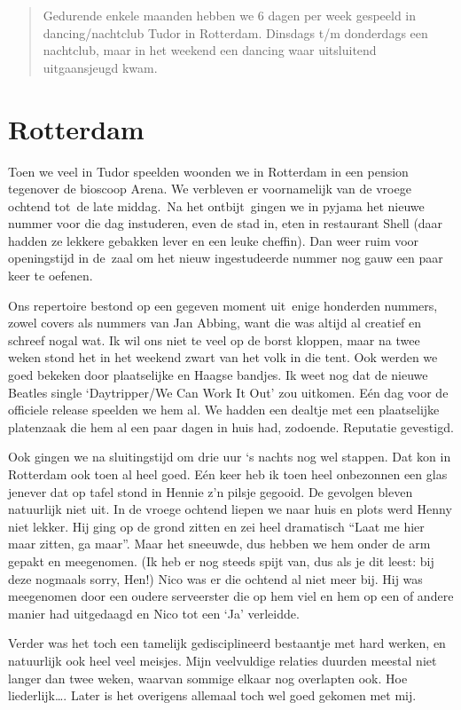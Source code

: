 \documentclass[12pt,twoside, openright]{memoir}
\begin{document}
\begin{quote}
Gedurende enkele maanden hebben we 6 dagen per week gespeeld in dancing/nachtclub Tudor in Rotterdam. Dinsdags t/m donderdags een nachtclub, maar in het weekend een dancing waar uitsluitend uitgaansjeugd kwam.
\end{quote} 

\section*{Rotterdam} %

Toen we veel in Tudor speelden woonden we in Rotterdam in een pension tegenover de bioscoop Arena. We verbleven er voornamelijk van de vroege ochtend tot de late middag. Na het ontbijt gingen we in pyjama het nieuwe nummer voor die dag instuderen, even de stad in, eten in restaurant Shell (daar hadden ze lekkere gebakken lever en een leuke cheffin). Dan weer ruim voor openingstijd in de zaal om het nieuw ingestudeerde nummer nog gauw een paar keer te oefenen. 

Ons repertoire bestond op een gegeven moment uit enige honderden nummers, zowel covers als nummers van Jan Abbing, want die was altijd al creatief en schreef nogal wat. Ik wil ons niet te veel op de borst kloppen, maar na twee weken stond het in het weekend zwart van het volk in die tent. Ook werden we goed bekeken door plaatselijke en Haagse bandjes. Ik weet nog dat de nieuwe Beatles single `Daytripper/We Can Work It Out' zou uitkomen. Eén dag voor de officiele release speelden we hem al. We hadden een dealtje met een plaatselijke platenzaak die hem al een paar dagen in huis had, zodoende. Reputatie gevestigd. 

Ook gingen we na sluitingstijd om drie uur `s nachts nog wel stappen. Dat kon in Rotterdam ook toen al heel goed. Eén keer heb ik toen heel onbezonnen een glas jenever dat op tafel stond in Hennie z'n pilsje gegooid. De gevolgen bleven natuurlijk niet uit. In de vroege ochtend liepen we naar huis en plots werd Henny niet lekker. Hij ging op de grond zitten en zei heel dramatisch ``Laat me hier maar zitten, ga maar''. Maar het sneeuwde, dus hebben we hem onder de arm gepakt en meegenomen. (Ik heb er nog steeds spijt van, dus als je dit leest: bij deze nogmaals sorry, Hen!) Nico was er die ochtend al niet meer bij. Hij was meegenomen door een oudere serveerster die op hem viel en hem op een of andere manier had uitgedaagd en Nico tot een `Ja' verleidde.

Verder was het toch een tamelijk gedisciplineerd bestaantje met hard werken, en natuurlijk ook heel veel meisjes. Mijn veelvuldige relaties duurden meestal niet langer dan twee weken, waarvan sommige elkaar nog overlapten ook. Hoe liederlijk\ldots. Later is het overigens allemaal toch wel goed gekomen met mij. 
\end{document}
